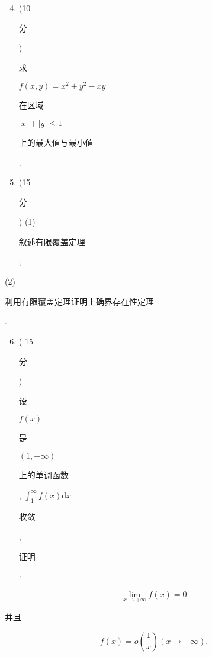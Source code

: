 \documentclass[10pt]{article}
\begin{document}
\begin{enumerate}
  \setcounter{enumi}{3}
  \item (10 \begin{CJK}{UTF8}{mj}分\end{CJK}) \begin{CJK}{UTF8}{mj}求\end{CJK} $f(x, y)=x^{2}+y^{2}-x y$ \begin{CJK}{UTF8}{mj}在区域\end{CJK} $|x|+|y| \leqslant 1$ \begin{CJK}{UTF8}{mj}上的最大值与最小值\end{CJK}.

  \item (15 \begin{CJK}{UTF8}{mj}分\end{CJK}) (1) \begin{CJK}{UTF8}{mj}叙述有限覆盖定理\end{CJK};

\end{enumerate}
(2) \begin{CJK}{UTF8}{mj}利用有限覆盖定理证明上确界存在性定理\end{CJK}.

\begin{enumerate}
  \setcounter{enumi}{5}
  \item ( 15 \begin{CJK}{UTF8}{mj}分\end{CJK}) \begin{CJK}{UTF8}{mj}设\end{CJK} $f(x)$ \begin{CJK}{UTF8}{mj}是\end{CJK} $(1,+\infty)$ \begin{CJK}{UTF8}{mj}上的单调函数\end{CJK}, $\int_{1}^{\infty} f(x) \mathrm{d} x$ \begin{CJK}{UTF8}{mj}收敛\end{CJK}, \begin{CJK}{UTF8}{mj}证明\end{CJK}:
\end{enumerate}
$$
\lim _{x \rightarrow+\infty} f(x)=0
$$
\begin{CJK}{UTF8}{mj}并且\end{CJK}
$$
f(x)=o\left(\frac{1}{x}\right)(x \rightarrow+\infty) .
$$
\end{document}
